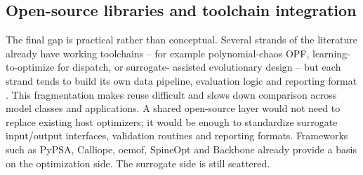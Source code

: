 \subsection{Open-source libraries and toolchain integration}
\label{sec:ch:tooling}
The final gap is practical rather than conceptual. Several strands of
the literature already have working toolchains -- for example
polynomial-chaos OPF, learning-to-optimize for dispatch, or surrogate-
assisted evolutionary design -- but each strand tends to build its own
data pipeline, evaluation logic and reporting format
\cite{Muhlpfordt20194806,Mitrovic2023__2,Mitrovic2023__3,Wu2022231,Chen20244723,Chen2022,Hirvonen2017323,Schulte2020}.
This fragmentation makes reuse difficult and slows down comparison
across model classes and applications. A shared open-source layer would
not need to replace existing host optimizers; it would be enough to
standardize surrogate input/output interfaces, validation routines and
reporting formats. Frameworks such as PyPSA, Calliope, oemof, SpineOpt
and Backbone already provide a basis on the optimization side. The
surrogate side is still scattered.
